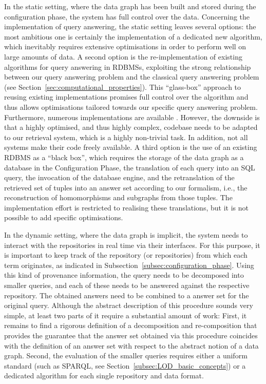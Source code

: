 In the static setting, where the data graph has been built and stored during the
configuration phase, the system has full control over the data.
Concerning the implementation of query answering,
the static setting leaves several options:
the most ambitious one is certainly the implementation of a dedicated new
algorithm, which inevitably requires extensive optimisations in order to perform
well on large amounts of data.
A second option is the re-implementation of existing algorithms
for query answering in \glspl{RDBMS}, exploiting the strong relationship
between our query answering problem and the classical query answering problem
(see Section~\ref{sec:computational_properties}).
This \enquote{glass-box} approach to reusing existing implementations promises
full control over the algorithm and thus allows optimisations tailored
towards our specific query answering problem.
Furthermore, numerous implementations are available \autocite[cf.][]{WikiSQLRDBMSs}.
However, the downside is that a highly optimised, and thus highly complex,
codebase needs to be adapted to our retrieval system, which is a
highly non-trivial task. In addition, not all systems make their code freely available.
A third option is the use of an existing \gls{RDBMS} as a \enquote{black box},
which requires the storage of the data graph as a database in the Configuration Phase,
the translation of each query into an SQL query,
the invocation of the database engine,
and the retranslation of the retrieved set of tuples
into an answer set according to our formalism, i.e.,
the reconstruction of homomorphisms and subgraphs from those tuples.
The implementation effort is restricted to realising these translations,
but it is not possible to add specific optimisations.

In the dynamic setting, where the data graph is implicit,
the system needs to interact with the repositories in real time via their interfaces.
For this purpose, it is important to keep track of the repository (or repositories)
from which each term originates, as indicated in Subsection~\ref{subsec:configuration_phase}.
Using this kind of provenance information, the query needs to be decomposed into
smaller queries, and each of these needs to be answered against the respective repository.
The obtained answers need to be combined to a answer set for the original query.
Although the abstract description of this procedure sounds very simple,
at least two parts of it require a substantial amount of work:
First, it remains to find a rigorous definition of a decomposition and re-composition
that provides the guarantee that the answer set obtained via this procedure 
coincides with the definition of an answer set with respect to the abstract notion
of a data graph.
Second, the evaluation of the smaller queries
requires either a uniform standard (such as \gls{SPARQL}, see Section~\ref{subsec:LOD_basic_concepts})
or a dedicated algorithm for each single repository and data format.
%
%


